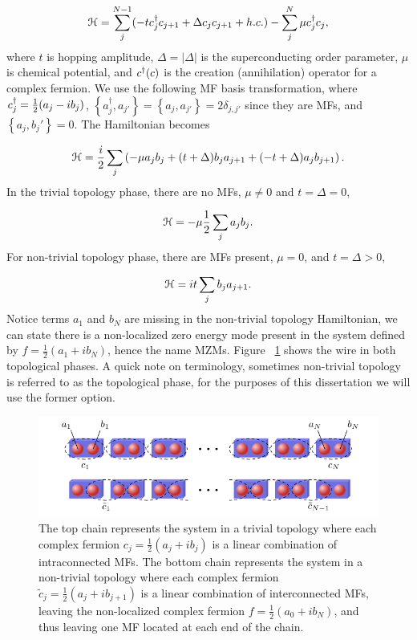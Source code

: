\begin{equation}
  \mathcal{H} = \sum_j^{N-1} (-t c^{\dagger}_j c_{j+1} + \Delta c_j c_{j+1} + h.c.) - \sum_j^{N} \mu c^{\dagger}_j c_j,
\end{equation}
where $t$ is hopping amplitude, $\Delta = |\Delta|$ is the superconducting order parameter, $\mu$ is chemical potential, and $c^{\dagger} (c)$ is the creation (annihilation) operator for a complex fermion.
We use the following MF basis transformation, where
$c^{\dagger}_j = \tfrac{1}{2} (a_j - i b_j)$, $\left\{ a^{\dagger}_j, a_{j'} \right\} = \left\{ a_j, a_{j'} \right\} = 2\delta_{j,j'}$
since they are MFs, and $\left\{a_j,b_j'\right\} = 0$.
The Hamiltonian becomes

\begin{equation}
  \mathcal{H} = \dfrac{i}{2} \sum_j \left( -\mu a_j b_j + (t+\Delta) b_j a_{j+1} + (-t+\Delta) a_j b_{j+1} \right).
\end{equation}
In the trivial topology phase, there are no MFs, $\mu \neq 0$ and $t=\Delta=0$,

\begin{equation}
  \mathcal{H} = -\mu\dfrac{1}{2} \sum_j a_j b_j.
\end{equation}
For non-trivial topology phase, there are MFs present, $\mu = 0$, and $t = \Delta > 0$,

\begin{equation}
  \mathcal{H} = it \sum_j b_j a_{j+1}.
\end{equation}
Notice terms $a_1$ and $b_N$ are missing in the non-trivial topology Hamiltonian, we can state there is a non-localized zero energy mode present in the system defined by $f = \tfrac{1}{2}(a_1 + i b_N)$, hence the name MZMs.
Figure ~\ref{fig:kitaev-chain} shows the wire in both topological phases.
A quick note on terminology, sometimes non-trivial topology is referred to as the topological phase, for the purposes of this dissertation we will use the former option.

\begin{figure}
  \includegraphics[width=\textwidth]{./figures/kitaev-chain.pdf}
  \caption{The top chain represents the system in a trivial topology where each complex fermion $c_j = \tfrac{1}{2}(a_j + i b_j)$ is a linear combination of intraconnected MFs. The bottom chain represents the system in a non-trivial topology where each complex fermion $\tilde{c}_j = \tfrac{1}{2}(a_j + i b_{j+1})$ is a linear combination of interconnected MFs, leaving the non-localized complex fermion $f = \tfrac{1}{2}(a_0 + i b_N)$, and thus leaving one MF located at each end of the chain.}
  \label{fig:kitaev-chain}
\end{figure}

